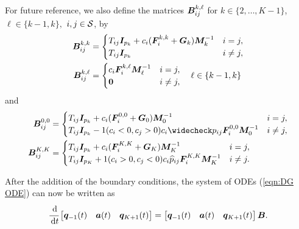 For future reference, we also define the matrices \({{\boldsymbol B}}^{k,\ell}_{ij}\) for \(k\in\{2,\dots,K-1\}\), \(\ell\in\{k-1,k\},\) \(i,j\in\mathcal{S}\), by
\begin{align*}
	{{\boldsymbol B}}^{k,k}_{ij} &= \begin{cases}T_{ij}\boldsymbol I_{p_k} + c_i(\boldsymbol F_i^{k,k}+\boldsymbol G_k)\boldsymbol M_k^{-1} & i=j,\\T_{ij} \boldsymbol I_{p_k}& i\neq j,\end{cases}
\\	{{\boldsymbol B}}^{k,\ell}_{ij} &= \begin{cases}c_i\boldsymbol F_i^{k,\ell}\boldsymbol M_\ell^{-1} & i=j,\\\boldsymbol 0 & i\neq j,\end{cases}\quad \ell \in \{k-1,k\}
\end{align*}
and
\begin{align*}
	{{\bs B}}^{0,0}_{ij} &= \begin{cases}T_{ij}\bs I_{p_k} + c_i(\bs F_i^{0,0}+\bs G_0)\bs M_0^{-1} & i=j,\\T_{ij}\bs I_{p_k} - 1(c_i<0,c_j>0)c_i\widecheck p_{ij} \bs F_i^{0,0}\bs M_0^{-1} & i\neq j,\end{cases}
\\	{{\bs B}}^{K,K}_{ij} &= \begin{cases}T_{ij}\bs I_{p_k} + c_i(\bs F_i^{K,K}+\bs G_K)\bs M_K^{-1} & i=j,\\T_{ij}\bs I_{p_K} + 1(c_i>0,c_j<0)c_i\widehat p_{ij} \bs F_i^{K,K}\bs M_K^{-1} & i\neq j.\end{cases}
\end{align*}

After the addition of the boundary conditions, the system of ODEs (\ref{eqn:DG ODE}) can now be written as 
\begin{align}\label{eqn: DG ODE w BCs}
	\cfrac{\, \mathrm{d}}{\, \mathrm{d} t} \begin{bmatrix} \boldsymbol q_{{-1}}(t) & {\boldsymbol a}(t) & \boldsymbol q_{K+1}(t) \end{bmatrix} 
	= \begin{bmatrix} \boldsymbol q_{{-1}}(t) & {\boldsymbol a}(t) & \boldsymbol q_{K+1}(t) \end{bmatrix} \boldsymbol B.
\end{align}

